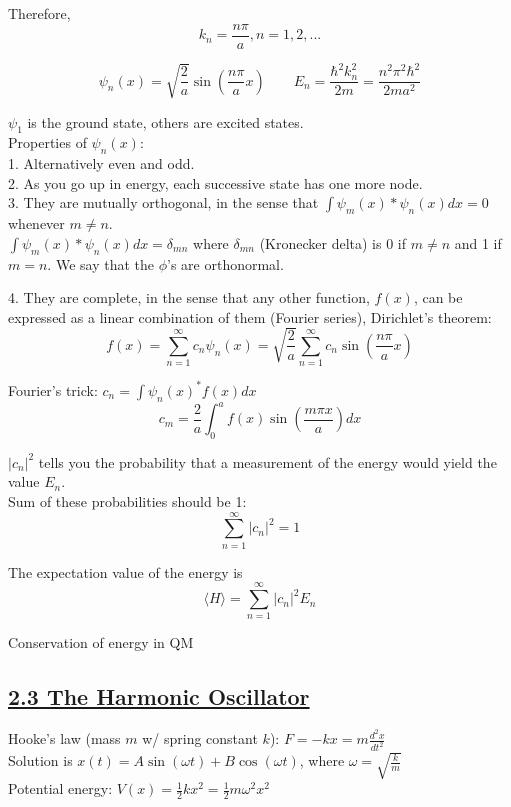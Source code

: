 Therefore, $$k_n = \frac{n \pi}{a}, n = 1, 2, ...$$

$$\psi_n(x) = \sqrt{\frac{2}{a}} \sin(\frac{n \pi}{a} x) \qquad E_n = \frac{\hbar^2 k_n^2}{2m} = \frac{n^2 \pi^2 \hbar^2}{2ma^2}$$

$\psi_1$ is the ground state, others are excited states. \\

Properties of $\psi_n(x)$: \\
1. Alternatively even and odd. \\
2. As you go up in energy, each successive state has one more node. \\
3. They are mutually orthogonal, in the sense that $\int \psi_m(x)* \psi_n(x) dx = 0$ whenever $m \neq n$. \\

$\int \psi_m (x)* \psi_n(x) dx = \delta_{mn}$
where $\delta_{mn}$ (Kronecker delta) is 0 if $m \neq n$ and 1 if $m=n$. We say that the $\phi$'s are orthonormal.

4. They are complete, in the sense that any other function, $f(x)$, can be expressed as a linear combination of them (Fourier series), Dirichlet's theorem:
    $$f(x) = \sum_{n=1}^{\infty} c_n \psi_n(x) = \sqrt{\frac{2}{a}} \sum_{n=1}^{\infty} c_n \sin(\frac{n \pi}{a} x)$$

Fourier's trick: $c_n = \int \psi_n(x)^* f(x) dx$ \\
$$c_m = \frac{2}{a} \int_0^a f(x) \sin(\frac{m \pi x}{a}) dx$$

$|c_n|^2$ tells you the probability that a measurement of the energy would yield the value $E_n$. \\

Sum of these probabilities should be 1: 
    $$\sum_{n=1}^{\infty} |c_n|^2 = 1$$

The expectation value of the energy is
    $$\langle H \rangle = \sum_{n=1}^{\infty} |c_n|^2 E_n$$

Conservation of energy in QM

\subsection{\underline{2.3 The Harmonic Oscillator}}
Hooke's law (mass $m$ w/ spring constant $k$): $F = -kx = m \frac{d^2 x}{d t^2}$ \\
Solution is $x(t) = A \sin(\omega t) + B \cos(\omega t)$, where $\omega = \sqrt{\frac{k}{m}}$ \\
Potential energy: $V(x) = \frac{1}{2} k x^2 = \frac{1}{2} m \omega^2 x^2$ \\

